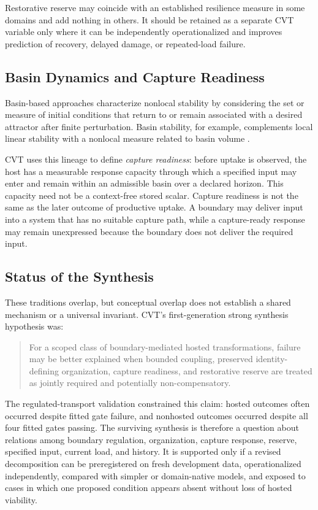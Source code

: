 \documentclass[11pt]{article}
\begin{document}
Restorative reserve may coincide with an established resilience measure in some domains and add nothing in others. It should be retained as a separate CVT variable only where it can be independently operationalized and improves prediction of recovery, delayed damage, or repeated-load failure.

\subsection{Basin Dynamics and Capture Readiness}

Basin-based approaches characterize nonlocal stability by considering the set or measure of initial conditions that return to or remain associated with a desired attractor after finite perturbation. Basin stability, for example, complements local linear stability with a nonlocal measure related to basin volume \cite{menck2013}.

CVT uses this lineage to define \emph{capture readiness}: before uptake is observed, the host has a measurable response capacity through which a specified input may enter and remain within an admissible basin over a declared horizon. This capacity need not be a context-free stored scalar. Capture readiness is not the same as the later outcome of productive uptake. A boundary may deliver input into a system that has no suitable capture path, while a capture-ready response may remain unexpressed because the boundary does not deliver the required input.

\subsection{Status of the Synthesis}

These traditions overlap, but conceptual overlap does not establish a shared mechanism or a universal invariant. CVT's first-generation strong synthesis hypothesis was:

\begin{quote}
For a scoped class of boundary-mediated hosted transformations, failure may be better explained when bounded coupling, preserved identity-defining organization, capture readiness, and restorative reserve are treated as jointly required and potentially non-compensatory.
\end{quote}

The regulated-transport validation constrained this claim: hosted outcomes often occurred despite fitted gate failure, and nonhosted outcomes occurred despite all four fitted gates passing. The surviving synthesis is therefore a question about relations among boundary regulation, organization, capture response, reserve, specified input, current load, and history. It is supported only if a revised decomposition can be preregistered on fresh development data, operationalized independently, compared with simpler or domain-native models, and exposed to cases in which one proposed condition appears absent without loss of hosted viability.
\end{document}
